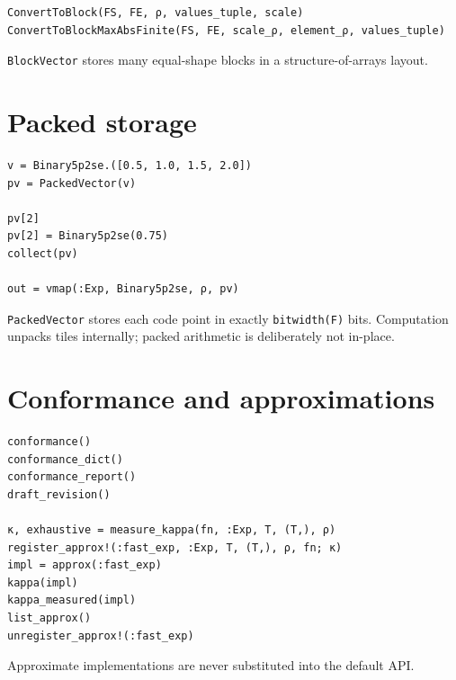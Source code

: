 \begin{verbatim}
ConvertToBlock(FS, FE, ρ, values_tuple, scale)
ConvertToBlockMaxAbsFinite(FS, FE, scale_ρ, element_ρ, values_tuple)
\end{verbatim}



\texttt{BlockVector} stores many equal-shape blocks in a structure-of-arrays layout.



\section{Packed storage}



\label{8567984038512272605}{}



\begin{verbatim}
v = Binary5p2se.([0.5, 1.0, 1.5, 2.0])
pv = PackedVector(v)

pv[2]
pv[2] = Binary5p2se(0.75)
collect(pv)

out = vmap(:Exp, Binary5p2se, ρ, pv)
\end{verbatim}



\texttt{PackedVector} stores each code point in exactly \texttt{bitwidth(F)} bits. Computation unpacks tiles internally; packed arithmetic is deliberately not in-place.



\section{Conformance and approximations}



\label{9146403741965371237}{}



\begin{verbatim}
conformance()
conformance_dict()
conformance_report()
draft_revision()

κ, exhaustive = measure_kappa(fn, :Exp, T, (T,), ρ)
register_approx!(:fast_exp, :Exp, T, (T,), ρ, fn; κ)
impl = approx(:fast_exp)
kappa(impl)
kappa_measured(impl)
list_approx()
unregister_approx!(:fast_exp)
\end{verbatim}



Approximate implementations are never substituted into the default API.



